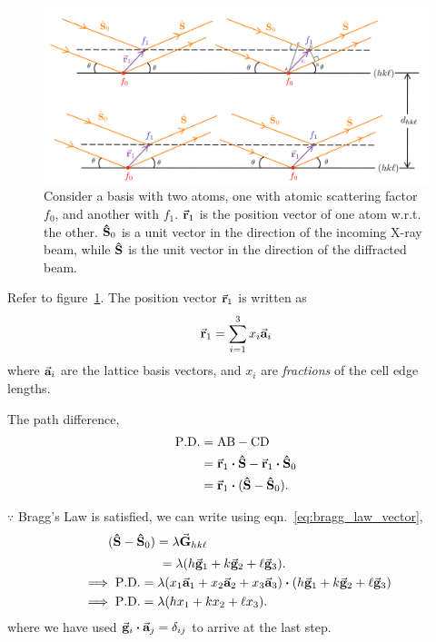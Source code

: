 	\begin{figure}
	\centering
	\includegraphics[scale=0.15]{structure_factor.png}
	\caption{\label{fig:struct_fact}Consider a basis with two atoms, one with atomic scattering factor $f_0$, and another with $f_1.$ $\va{r}_1$ is the position vector of one atom w.r.t. the other. $\vu{S}_0$ is a unit vector in the direction of the incoming X-ray beam, while $\vu{S}$ is the unit vector in the direction of the diffracted beam.}
	\end{figure}
	
	Refer to figure~\ref{fig:struct_fact}. The position vector $\va{r}_1$ is written as%
%	
	\begin{equation}
	\va{r}_1 = \sum_{i=1}^3 x_i \va{a}_i
	\end{equation}%
%	
	where $\va{a}_i$ are the lattice basis vectors, and $x_i$ are \textit{fractions} of the cell edge lengths.
	
	The path difference,%
%	
	\begin{align}
	\mathrm{P.D.} &= \mathrm{AB} - \mathrm{CD} \nonumber \\
				  &= \va{r}_1 \vdot \vu{S} - \va{r}_1 \vdot \vu{S}_0 \nonumber \\
				  &= \va{r}_1 \vdot ( \vu{S} - \vu{S}_0 ).
	\end{align}
	
	$\because$ Bragg's Law is satisfied, we can write using eqn.~\eqref{eq:bragg_law_vector},%
%		
	\begin{align}
	&\phantom{\implies} ( \vu{S} - \vu{S}_0 ) = \lambda \va{G}_{hk\ell} \nonumber\\
	&\phantom{ \implies ( \vu{S} - \vu{S}_0 ) } = \lambda \qty( h \va{g}_1 + k \va{g}_2 + \ell \va{g}_3 ).\\
	&\implies \mathrm{P.D.} = \lambda \qty( x_1 \va{a}_1 + x_2 \va{a}_2 + x_3 \va{a}_3 ) \vdot \qty( h \va{g}_1 + k \va{g}_2 + \ell \va{g}_3 ) \nonumber \\
	&\implies \mathrm{P.D.} = \lambda \qty( h x_1 + k x_2 + \ell x_3 ).
	\end{align}%
%	
	where we have used $\va{g}_i \vdot \va{a}_j = \delta_{ij}$ to arrive at the last step.
	
